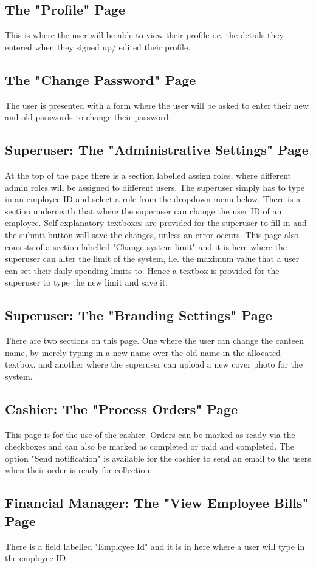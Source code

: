 \documentclass[12pt]{article}
\begin{document}
\subsection{The "Profile" Page} 
This is where the user will be able to view their profile i.e. the details they entered when they signed up/ edited their profile. 

\subsection{The "Change Password" Page} 
The user is presented with a form where the user will be asked to enter their new and old passwords to change their password. 

\subsection{Superuser: The "Administrative Settings" Page} 
At the top of the page there is a section labelled assign roles, where different admin roles will be assigned to different users. The superuser simply has to type in an employee ID and select a role from the dropdown menu below. There is a section underneath that where the superuser can change the user ID of an employee. Self explanatory textboxes are provided for the superuser to fill in and the submit button will save the changes, unless an error occurs.  This page also consists of a section labelled "Change system limit" and it is here where the superuser can alter the limit of the system, i.e. the maximum value that a user can set their daily spending limits to. Hence a textbox is provided for the superuser to type the new limit and save it.

\subsection{Superuser: The "Branding Settings" Page} 
There are two sections on this page. One where the user can change the canteen name, by merely typing in a new name over the old name in the allocated textbox, and another where the superuser can upload a new cover photo for the system.

\subsection{Cashier: The "Process Orders" Page}
This page is for the use of the cashier. Orders can be marked as ready via the checkboxes and can also be marked as completed or paid and completed. The option "Send notification" is available for the cashier to send an email to the users when their order is ready for collection.

\subsection{Financial Manager: The "View Employee Bills" Page}
There is a field labelled "Employee Id" and it is in here where a user will type in the employee ID 
\end{document}
